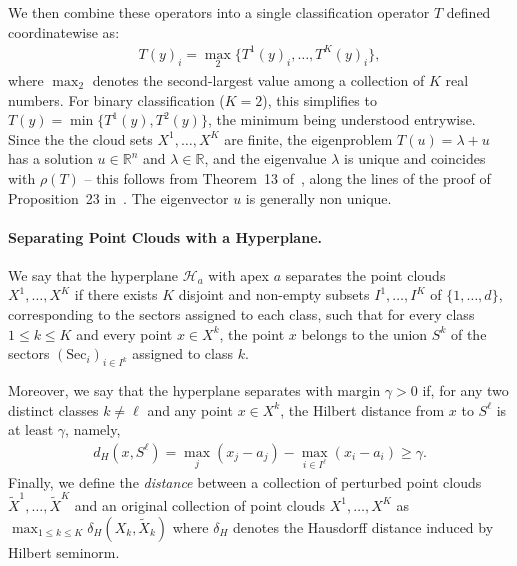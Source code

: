 \documentclass{article}
\renewcommand{\geq}{\geqslant}
\renewcommand{\leq}{\leqslant}
\newcommand{\R}{\mathbb{R}}
\begin{document}
We then combine these operators into a single classification operator $T$ defined coordinatewise as:
\begin{align}
  T(y)_i = \operatorname{\max}_2\{T^1(y)_i, \dots, T^K(y)_i\}\label{eq:single_operator},
\end{align}
where $\operatorname{\max}_2$ denotes the second-largest value among a collection of $K$ real numbers. For binary classification ($K=2$), this simplifies to $T(y)=\min\{T^1(y), T^2(y)\}$, the minimum being understood entrywise. Since the
the cloud sets $X^1,\dots,X^K$ are finite, the eigenproblem
$T(u) =\lambda + u$ has a solution $u\in \R^n$ and $\lambda\in \R$,
and the eigenvalue $\lambda$ is unique and coincides with $\rho(T)$ -- this follows
from Theorem~13 of~\cite{gaubert2004}, along the lines of the proof of Proposition~23
in~\cite{akiangaubertqisaadi}. The eigenvector $u$ is generally non unique.



\paragraph{Separating Point Clouds with a Hyperplane.}

We say that the hyperplane $\mathcal{H}_a$ with apex $a$ separates the point clouds $X^1, \ldots, X^K$ if there exists $K$ disjoint and non-empty subsets $I^1, \ldots, I^K$ of $\{1, \ldots, d\}$, corresponding to the sectors assigned to each class, such that for every class $1 \leq k \leq K$ and every point $x \in X^k$, the point $x$ belongs to the union $S^k$ of the sectors $(\text{Sec}_i)_{i\in I^k}$ assigned to class $k$.

Moreover, we say that the hyperplane separates with margin $\gamma > 0$ if, for any two distinct classes $k \neq \ell$ and any point $x \in X^k$, the Hilbert distance from $x$ to $S^\ell$ is at least $\gamma$, namely,
\begin{align}
d_H(x, S^\ell) = \max_j(x_j - a_j) - \max_{i \in I^\ell}(x_i - a_i) \geq \gamma.
\end{align}
Finally, we define the {\em distance} between a collection of perturbed point clouds $\tilde{X}^1,\dots, \tilde{X}^K$ and an original collection of point clouds $X^1,\dots,X^K$ as $\max_{1\leq k\leq K} \delta_H(X_k,\tilde{X}_k)$ where $\delta_H$ denotes the Hausdorff distance induced by Hilbert seminorm.
\end{document}
